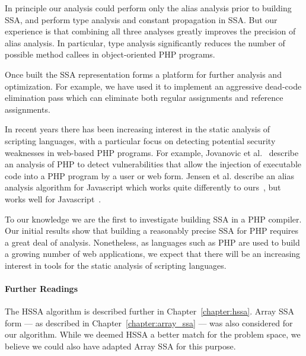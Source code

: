 In principle our analysis could perform only the alias analysis prior
to building SSA, and perform type analysis and constant propagation in
SSA. But our experience is that combining all three analyses greatly
improves the precision of alias analysis.  In particular, type
analysis significantly reduces the number of possible method callees
in object-oriented PHP programs.


Once built the SSA representation forms a platform for further
analysis and optimization. For example, we have used it to implement
an aggressive dead-code elimination pass which can eliminate both
regular assignments and reference assignments.

In recent years there has been increasing interest in the static
analysis of scripting languages, with a particular focus on detecting
potential security weaknesses in web-based PHP programs. For example,
Jovanovic et al.~\cite{Jovanovic06pixy:a} describe an analysis of PHP
to detect vulnerabilities that allow the injection of executable code
into a PHP program by a user or web form. Jensen et al.  describe an
alias analysis algorithm for Javascript which works quite differently
to ours~\cite{Biggar2010}, but works well for Javascript~\cite{Jensen+2009}.

To our knowledge we are the first to investigate building SSA in a PHP
compiler. Our initial results show that building a reasonably precise
SSA for PHP requires a great deal of analysis. Nonetheless, as
languages such as PHP are used to build a growing number of web
applications, we expect that there will be an increasing interest in
tools for the static analysis of scripting languages.

\paragraph{Further Readings}

The HSSA algorithm is described further in Chapter~\ref{chapter:hssa}. Array SSA
form --- as described in Chapter~\ref{chapter:array_ssa} --- was also
considered for our algorithm. While we deemed HSSA a better match for
the problem space, we believe we could also have adapted Array SSA for
this purpose.

